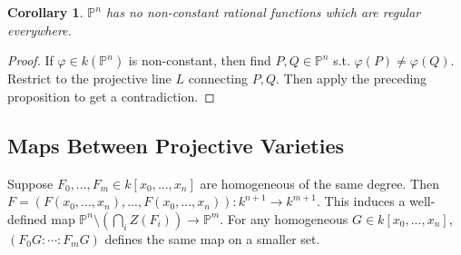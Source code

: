\documentclass{article}
\theoremstyle{definition}
\theoremstyle{remark}
\theoremstyle{plain}
\newtheorem{crly}[defn]{Corollary}
\newcommand{\PP}{\mathbb{P}}
\begin{document}
\begin{crly}
    $\PP^n$ has no non-constant rational functions which are regular everywhere.
\end{crly}
\begin{proof}
    If $\varphi\in k(\PP^n)$ is non-constant, then find $P,Q\in\PP^n$ s.t. $\varphi(P)\neq\varphi(Q)$. Restrict to the projective line $L$ connecting $P,Q$. Then apply the preceding proposition to get a contradiction.
\end{proof}
\subsection{Maps Between Projective Varieties}
Suppose $F_0,...,F_m\in k[x_0,...,x_n]$ are homogeneous of the same degree. Then $F=(F(x_0,...,x_n),...,F(x_0,...,x_n)):k^{n+1}\to k^{m+1}$. This induces a well-defined map $\PP^n\setminus(\bigcap_iZ(F_i))\to\PP^m$. For any homogeneous $G\in k[x_0,...,x_n]$, $(F_0G:\cdots:F_mG)$ defines the same map on a smaller set.
\end{document}

